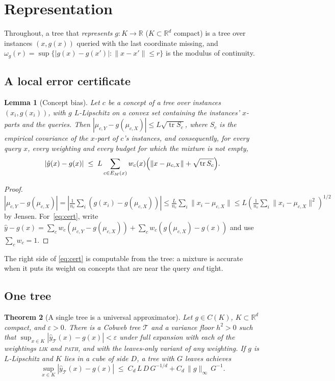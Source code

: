 \documentclass[11pt]{article}
\newtheorem{theorem}{Theorem}
\newtheorem{lemma}[theorem]{Lemma}
\theoremstyle{definition}
\theoremstyle{remark}
\newcommand{\R}{\mathbb{R}}
\newcommand{\T}{\mathcal{T}}
\newcommand{\hy}{\hat{y}}
\newcommand{\tr}{\operatorname{tr}}
\begin{document}
\section{Representation}\label{sec:repr}

Throughout, a tree that \emph{represents} $g:K\to\R$ ($K\subset\R^d$ compact) is a tree
over instances $(x,g(x))$ queried with the last coordinate missing, and
$\omega_g(r)=\sup\{|g(x)-g(x')|:\|x-x'\|\le r\}$ is the modulus of continuity.

\subsection{A local error certificate}

\begin{lemma}[Concept bias]\label{lem:bias}
Let $c$ be a concept of a tree over instances $(x_i,g(x_i))$, with $g$ $L$-Lipschitz on a
convex set containing the instances' $x$-parts and the queries.
Then $|\mu_{c,Y}-g(\mu_{c,X})|\le L\sqrt{\tr S_c}$, where $S_c$ is the empirical
covariance of the $x$-part of $c$'s instances, and consequently, for every query $x$,
every weighting and every budget for which the mixture is not empty,
\begin{equation}\label{eq:cert}
  |\hy(x)-g(x)|\;\le\;L\sum_{c\in E_M(x)}w_c(x)\Bigl(\|x-\mu_{c,X}\|+\sqrt{\tr S_c}\Bigr).
\end{equation}
\end{lemma}
\begin{proof}
$|\mu_{c,Y}-g(\mu_{c,X})|=|\tfrac{1}{n_c}\sum_i(g(x_i)-g(\mu_{c,X}))|\le
\tfrac{L}{n_c}\sum_i\|x_i-\mu_{c,X}\|\le L(\tfrac1{n_c}\sum_i\|x_i-\mu_{c,X}\|^2)^{1/2}$
by Jensen.  For~\eqref{eq:cert}, write $\hy-g(x)=\sum_c w_c(\mu_{c,Y}-g(\mu_{c,X}))+
\sum_c w_c(g(\mu_{c,X})-g(x))$ and use $\sum_cw_c=1$.
\end{proof}

The right side of \eqref{eq:cert} is computable from the tree: a mixture is accurate
when it puts its weight on concepts that are near the query \emph{and} tight.

\subsection{One tree}

\begin{theorem}[A single tree is a universal approximator]\label{thm:single}
Let $g\in C(K)$, $K\subset\R^d$ compact, and $\varepsilon>0$.  There is a Cobweb tree $\T$
and a variance floor $h^2>0$ such that $\sup_{x\in K}|\hy_\T(x)-g(x)|<\varepsilon$ under
full expansion with each of the weightings \textsc{lik} and \textsc{path}, and with the
leaves-only variant of any weighting.  If $g$ is $L$-Lipschitz and $K$ lies in a cube of side $D$, a tree with $G$ leaves
achieves
\begin{equation}\label{eq:singlerate}
  \sup_{x\in K}|\hy_\T(x)-g(x)|\;\le\;C_{d}\,L\,D\,G^{-1/d}+C_{d}\,\|g\|_\infty\,G^{-1}.
\end{equation}
\end{theorem}
\end{document}

